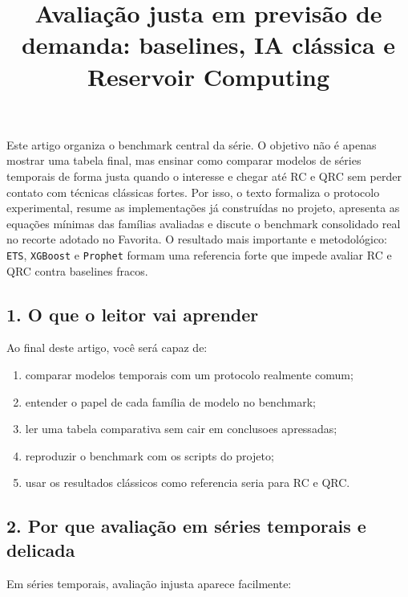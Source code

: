 \documentclass[12pt]{article}
\title{Avaliação justa em previsão de demanda: baselines, IA clássica e Reservoir Computing}
\author{}
\providecommand{\tightlist}{%
          \setlength{\itemsep}{0pt}\setlength{\parskip}{0pt}}
\begin{document}
        \maketitle

        \begin{resumo}
        Este artigo organiza o benchmark central da série. O objetivo não é apenas mostrar uma tabela final, mas ensinar como comparar modelos de séries temporais de forma justa quando o interesse e chegar até RC e QRC sem perder contato com técnicas clássicas fortes. Por isso, o texto formaliza o protocolo experimental, resume as implementações já construídas no projeto, apresenta as equações mínimas das famílias avaliadas e discute o benchmark consolidado real no recorte adotado no Favorita. O resultado mais importante e metodológico: \texttt{ETS}, \texttt{XGBoost} e \texttt{Prophet} formam uma referencia forte que impede avaliar RC e QRC contra baselines fracos.
        \end{resumo}

        \subsection{1. O que o leitor vai aprender}\label{1-o-que-o-leitor-vai-aprender}

Ao final deste artigo, você será capaz de:

\begin{enumerate}
\def\labelenumi{\arabic{enumi}.}
\tightlist
\item
  comparar modelos temporais com um protocolo realmente comum;
\item
  entender o papel de cada família de modelo no benchmark;
\item
  ler uma tabela comparativa sem cair em conclusoes apressadas;
\item
  reproduzir o benchmark com os scripts do projeto;
\item
  usar os resultados clássicos como referencia seria para RC e QRC.
\end{enumerate}

\subsection{2. Por que avaliação em séries temporais e delicada}\label{2-por-que-avaliauxe7uxe3o-em-suxe9ries-temporais-e-delicada}

Em séries temporais, avaliação injusta aparece facilmente:
\end{document}
